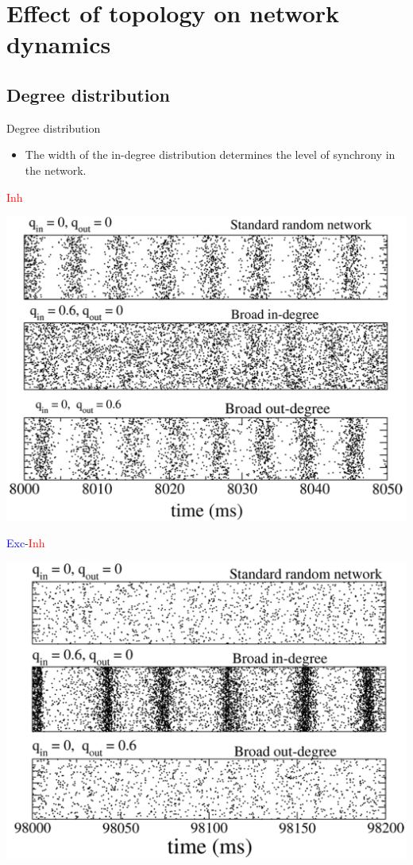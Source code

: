 \documentclass[fleqn]{beamer}
\newcommand{\ppc}[1]{\pause\setcounter{page}{#1}}
\begin{document}
\section{Effect of topology on network dynamics}

\subsection{Degree distribution}

\begin{frame}{Degree distribution}
  \begin{itemize}
    \item The width of the in-degree distribution determines the level of
synchrony in the network.
  \end{itemize}\ppc{7}
  \vspace*{.2cm}
\begin{minipage}{.48\linewidth}
\textcolor{red}{Inh}
    \begin{center}
	\includegraphics[width=\textwidth]{figures/roxin0}
    \end{center}
\end{minipage}\ppc{7}
\begin{minipage}{.48\linewidth}
    \textcolor{blue}{Exc}-\textcolor{red}{Inh}
    \begin{center}
    \includegraphics[width=\textwidth]{figures/roxin1}

\end{center}
\end{minipage}
\end{frame}
\end{document}
